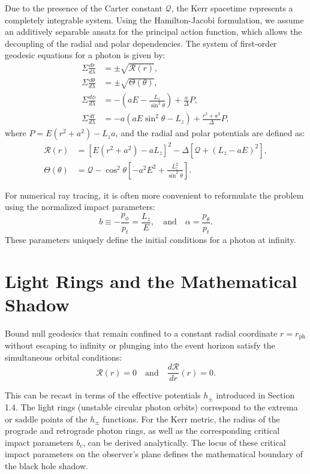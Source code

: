 \documentclass[11pt]{book}
\begin{document}
Due to the presence of the Carter constant $\mathcal{Q}$, the Kerr spacetime represents a completely integrable system. Using the Hamilton-Jacobi formulation, we assume an additively separable ansatz for the principal action function, which allows the decoupling of the radial and polar dependencies. The system of first-order geodesic equations for a photon is given by:
\begin{align}
    \Sigma \frac{dr}{d\lambda} &= \pm \sqrt{\mathcal{R}(r)}, \\
    \Sigma \frac{d\theta}{d\lambda} &= \pm \sqrt{\Theta(\theta)}, \\
    \Sigma \frac{d\phi}{d\lambda} &= -\left(aE - \frac{L_z}{\sin^2\theta}\right) + \frac{a}{\Delta} P, \\
    \Sigma \frac{dt}{d\lambda} &= -a\left(aE\sin^2\theta - L_z\right) + \frac{r^2 + a^2}{\Delta} P,
\end{align}
where $P = E(r^2 + a^2) - L_z a$, and the radial and polar potentials are defined as:
\begin{align}
    \mathcal{R}(r) &= \left[ E(r^2 + a^2) - a L_z \right]^2 - \Delta \left[ \mathcal{Q} + (L_z - a E)^2 \right], \\
    \Theta(\theta) &= \mathcal{Q} - \cos^2\theta \left[ - a^2 E^2 + \frac{L_z^2}{\sin^2\theta} \right].
\end{align}

For numerical ray tracing, it is often more convenient to reformulate the problem using the normalized impact parameters:
\begin{equation}
    b \equiv -\frac{p_\phi}{p_t} = \frac{L_z}{E}, \quad \text{and} \quad \alpha = \frac{p_\theta}{p_t}.
\end{equation}
These parameters uniquely define the initial conditions for a photon at infinity.

\section{Light Rings and the Mathematical Shadow}

Bound null geodesics that remain confined to a constant radial coordinate $r = r_{\text{ph}}$ without escaping to infinity or plunging into the event horizon satisfy the simultaneous orbital conditions:
\begin{equation}
    \mathcal{R}(r) = 0 \quad \text{and} \quad \frac{d\mathcal{R}}{dr}(r) = 0.
\end{equation}

This can be recast in terms of the effective potentials \(h_{\pm}\) introduced in Section 1.4. The light rings (unstable circular photon orbits) correspond to the extrema or saddle points of the \(h_{\pm}\) functions. For the Kerr metric, the radius of the prograde and retrograde photon rings, as well as the corresponding critical impact parameters \(b_c\), can be derived analytically. The locus of these critical impact parameters on the observer's plane defines the mathematical boundary of the black hole shadow.
\end{document}
